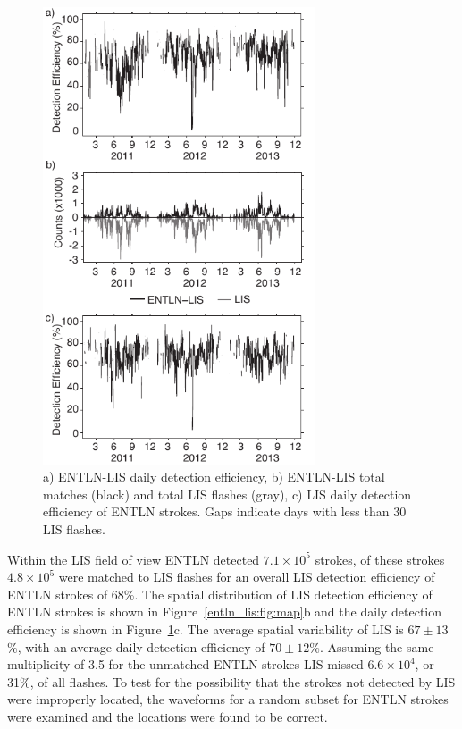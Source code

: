 \begin{figure}[t]
   \centering
   \noindent\includegraphics[width=19pc,angle=0]{entln_lis/Figures/de.pdf}
   \caption{a) ENTLN-LIS daily detection efficiency,
   		b) ENTLN-LIS total matches (black) and total LIS flashes (gray),
		c) LIS daily detection efficiency of ENTLN strokes.
		Gaps indicate days with less than 30 LIS flashes.
		}
   \label{entln_lis:fig:de}
\end{figure}

Within the LIS field of view ENTLN detected $7.1\times10^5$ strokes, of these strokes $4.8\times10^5$ were matched to LIS flashes for an overall LIS detection efficiency of ENTLN strokes of 68\%.
The spatial distribution of LIS detection efficiency of ENTLN strokes is shown in Figure~\ref{entln_lis:fig:map}b and the daily detection efficiency is shown in Figure~\ref{entln_lis:fig:de}c.
The average spatial variability of LIS is $67 \pm 13$\%, with an average daily detection efficiency of $70 \pm 12$\%.
Assuming the same multiplicity of 3.5 for the unmatched ENTLN strokes LIS missed $6.6\times10^4$, or 31\%, of all flashes.
To test for the possibility that the strokes not detected by LIS were improperly located, the waveforms for a random subset for ENTLN strokes were examined and the locations were found to be correct.

